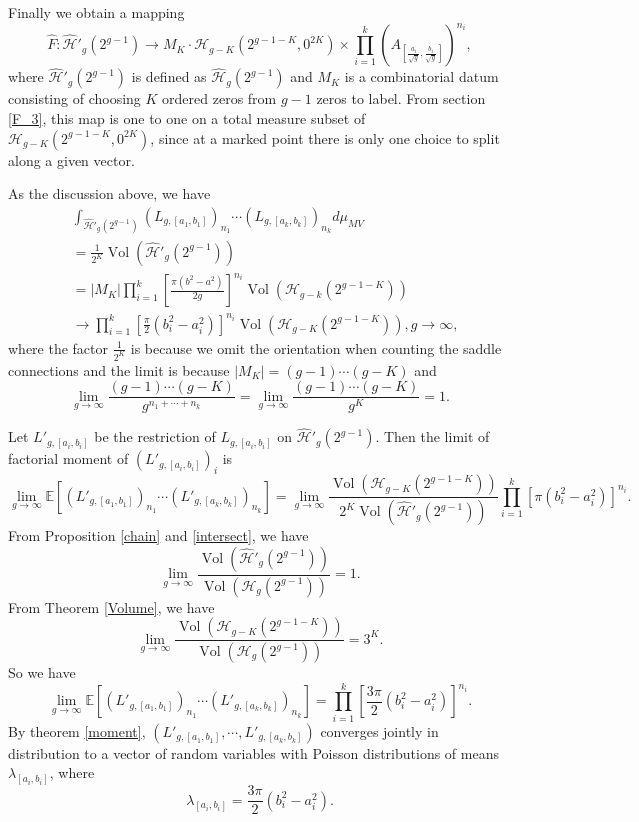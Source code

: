 \documentclass[12pt]{amsart} %
\theoremstyle{definition}
\theoremstyle{remark}
\numberwithin{equation}{section}
\renewcommand\H{{\mathcal H}}
\newcommand{\V}{\operatorname{Vol}}
\begin{document}
Finally  we obtain a mapping
$$\hat{F}: \hat{\H}'_g(2^{g-1}) \to M_K\cdot \H_{g-K}(2^{g-1-K},0^{2K}) \times \prod^k_{i=1} (A_{[\frac{a_i}{\sqrt{g}},\frac{b_i}{\sqrt{g}}]})^{n_i},$$
where $\hat{\H}'_g(2^{g-1})$ is defined as $\hat{\H}_g(2^{g-1})$
and $M_K$ is a combinatorial datum consisting of choosing $K$ ordered zeros from $g-1$ zeros to label. 
From section \ref{F_3}, this map is one to one on a total measure subset of $\H_{g-K}(2^{g-1-K},0^{2K})$, 
since at a marked point there is only one choice to split along a given vector.

As the discussion above, 
we have 
\begin{equation*}
\begin{aligned}
&\int_{\hat{\H}'_g(2^{g-1})}(L_{g,[a_1,b_1]})_{n_1}\cdots (L_{g,[a_k,b_k]})_{n_k}d\mu_{MV}\\&=\frac{1}{2^K}\V(\hat{\H}'_g(2^{g-1}))
\\&=|M_K|\prod^k_{i=1}[\frac{\pi(b^2-a^2)}{2g}]^{n_i}\V(\H_{g-k}(2^{g-1-K}))\\
&\to \prod^k_{i=1}[\frac{\pi}{2}(b_i^2-a_i^2)]^{n_i}\V(\H_{g-K}(2^{g-1-K})), g\to \infty,
\end{aligned}
\end{equation*}
where the factor $\frac{1}{2^K}$ is because we omit the orientation when counting the saddle connections
and the limit is because $|M_K|=(g-1)\cdots (g-K)$ and
$$\lim_{g\to \infty}\frac{(g-1)\cdots (g-K)}{g^{n_1+\cdots+n_k}}=\lim_{g\to \infty}\frac{(g-1)\cdots (g-K)}{g^K}=1.$$

Let $L'_{g,[a_i,b_i]}$ be the restriction of $L_{g,[a_i,b_i]}$ on $\hat{\H}'_g(2^{g-1})$.
Then the limit of factorial moment of $(L'_{g,[a_i,b_i]})_i$ is
$$\lim_{g\to \infty}\mathbb{E}[(L'_{g,[a_1,b_1]})_{n_1}\cdots (L'_{g,[a_k,b_k]})_{n_k}]=\lim_{g\to \infty}\frac{\V(\H_{g-K}(2^{g-1-K}))}{2^K\V(\hat{\H}'_g(2^{g-1}))}\prod^k_{i=1}[\pi(b_i^2-a_i^2)]^{n_i}.$$
From Proposition \ref{chain} and \ref{intersect}, we have
$$\lim_{g\to \infty}\frac{\V(\hat{\H}'_g(2^{g-1}))}{\V(\H_g(2^{g-1}))}=1.$$
From Theorem \ref{Volume}, we have
$$\lim_{g\to \infty}\frac{\V(\H_{g-K}(2^{g-1-K}))}{\V(\H_{g}(2^{g-1}))}=3^K.$$
So we have
$$\lim_{g\to \infty}\mathbb{E}[(L'_{g,[a_1,b_1]})_{n_1}\cdots (L'_{g,[a_k,b_k]})_{n_k}]=\prod^k_{i=1}[\frac{3\pi}{2}(b_i^2-a_i^2)]^{n_i}.$$
By theorem \ref{moment}, $(L'_{g,[a_1,b_1]},\cdots,L'_{g,[a_k,b_k]})$ converges jointly in distribution to a vector of random variables with Poisson distributions of means $\lambda_{[a_i,b_i]}$, where
$$\lambda_{[a_i,b_i]}=\frac{3\pi}{2}(b_i^2-a_i^2).$$
\end{document}
